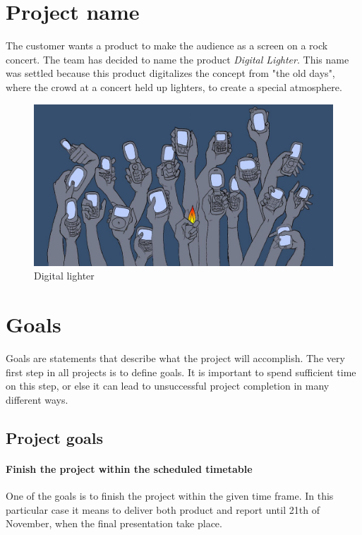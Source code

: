 \section{Project name}
The customer wants a product to make the audience as a screen on a rock concert. 
The team has decided to name the product \emph{Digital Lighter}. 
This name was settled because this product digitalizes the concept from "the old days", where the crowd at a concert held up lighters, to create a special atmosphere. 

\begin{figure}[hbt]
\centering
\includegraphics[width=\textwidth]{introduction/phones.jpg}
\caption{Digital lighter}
\label{fig:digital lighter}
\end{figure}


\section{Goals}
Goals are statements that describe what the project will accomplish. 
The very first step in all projects is to define goals. 
It is important to spend sufficient time on this step, or else it can lead to unsuccessful project completion in many different ways. 
   
\label{sec:project-goals}

\subsection{Project goals}

\paragraph{Finish the project within the scheduled timetable}
One of the goals is to finish the project within the given time frame. 
In this particular case it means to deliver both product and report until 21th of November, when the final presentation take place.

